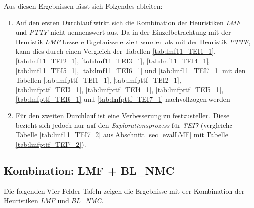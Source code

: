 \begin{multicols}{2}
\columnbreak
{}
\end{multicols}
\noindent
Aus diesen Ergebnissen lässt sich Folgendes ableiten:
\begin{enumerate}
\item 
Auf den ersten Durchlauf wirkt sich die Kombination der \Gls{Heuristik}en \emph{LMF} und \emph{PTTF} nicht nennenswert aus.
Da in der Einzelbetrachtung mit der \Gls{Heuristik} \emph{LMF} bessere Ergebnisse erzielt wurden als mit der \Gls{Heuristik} \emph{PTTF}, kann dies durch einen Vergleich der Tabellen \ref{tab:lmf11_TEI1_1}, \ref{tab:lmf11_TEI2_1}, \ref{tab:lmf11_TEI3_1}, \ref{tab:lmf11_TEI4_1}, \ref{tab:lmf11_TEI5_1}, \ref{tab:lmf11_TEI6_1} und \ref{tab:lmf11_TEI7_1} mit den Tabellen \ref{tab:lmfpttf_TEI1_1}, \ref{tab:lmfpttf_TEI2_1}, \ref{tab:lmfpttf_TEI3_1}, \ref{tab:lmfpttf_TEI4_1}, \ref{tab:lmfpttf_TEI5_1}, \ref{tab:lmfpttf_TEI6_1} und \ref{tab:lmfpttf_TEI7_1} nachvollzogen werden.

\item 
Für den zweiten Durchlauf ist eine Verbesserung zu festzustellen. Diese bezieht sich jedoch nur auf den \emph{Explorationsprozess} für \emph{TEI7} (vergleiche Tabelle \ref{tab:lmf11_TEI7_2} aus Abschnitt \ref{sec_evalLMF} mit Tabelle \ref{tab:lmfpttf_TEI7_2}).
\end{enumerate}

\subsection{Kombination: LMF + BL\_NMC}\label{sec_evalLMFBLNMC}
Die folgenden Vier-Felder Tafeln zeigen die Ergebnisse mit der Kombination der \Gls{Heuristik}en \emph{LMF} und \emph{BL\_NMC}.
\begin{multicols}{3}
\columnbreak
{}\columnbreak
{}
\end{multicols}

\begin{multicols}{2}
\columnbreak
{}
\end{multicols}

